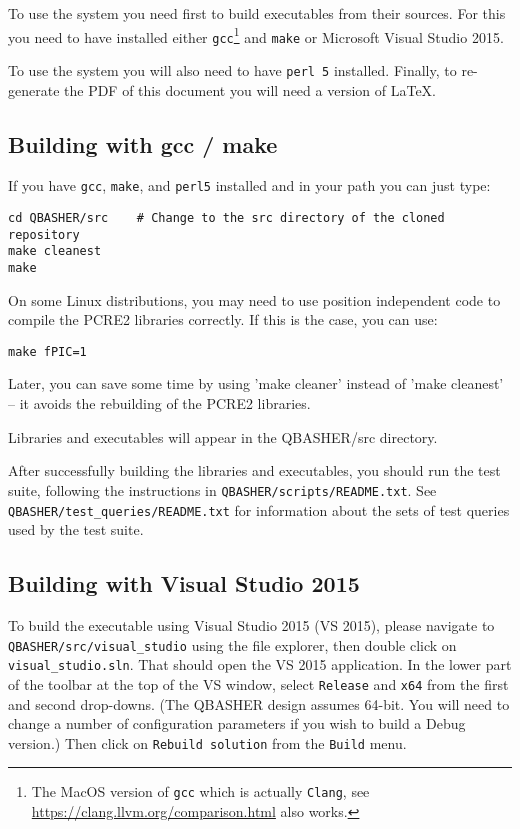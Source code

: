 \documentclass{article}
\begin{document}
To use the system you need first to build executables from their sources.
For this you need to have installed either \texttt{gcc}\footnote{The
  MacOS version of \texttt{gcc} which is actually \texttt{Clang}, see
  \url{https://clang.llvm.org/comparison.html} also works.}  and
\texttt{make} or Microsoft Visual Studio 2015.  

To use the system you will also need to have \texttt{perl 5}
installed.  Finally, to re-generate the PDF of this document you will
need a version of LaTeX.

\subsection{Building with gcc / make}

If you have \texttt{gcc}, \texttt{make}, and \texttt{perl5} installed
and in your path you can just type:

\begin{verbatim}
cd QBASHER/src    # Change to the src directory of the cloned repository
make cleanest
make
\end{verbatim}

On some Linux distributions, you may need to use position independent code
to compile the PCRE2 libraries correctly. If this is the case, you can use:
\begin{verbatim}
make fPIC=1
\end{verbatim}

Later, you can save some time by using 'make cleaner' instead of 'make
cleanest' -- it avoids the rebuilding of the PCRE2 libraries.

Libraries and executables will appear in the QBASHER/src directory.

After successfully building the libraries and executables, you should
run the test suite, following the instructions in
\texttt{QBASHER/scripts/README.txt}. See
\texttt{QBASHER/test\_queries/README.txt} for information about the
sets of test queries used by the test suite.


\subsection{Building with Visual Studio 2015}

To build the executable using Visual Studio 2015 (VS 2015), please navigate to
\texttt{QBASHER/src/visual\_studio} using the file explorer, then
double click on \texttt{visual\_studio.sln}. That should open the VS
2015 application.  In the lower part of the toolbar at the top
of the VS window, select \texttt{Release} and \texttt{x64} from the
first and second drop-downs.  (The QBASHER design assumes 64-bit.
You will need to change a number of configuration parameters if you
wish to build a Debug version.)
Then click on \texttt{Rebuild solution}
from the \texttt{Build} menu.  
\end{document}
